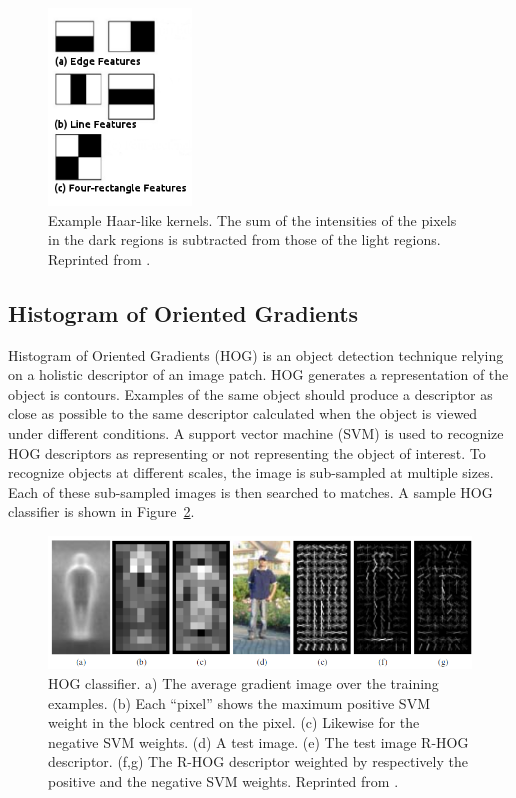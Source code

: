 \begin{figure}[t]
  \centering
  \includegraphics[width=1.5in]{figures/haar.jpg}  
  \caption[Haar kernel ]{Example Haar-like kernels. The sum of the intensities of the pixels in the dark regions is subtracted from those of the light regions. Reprinted from . }
  \label{fig:haar}
\end{figure}



\subsection{Histogram of Oriented Gradients}
Histogram of Oriented Gradients (HOG) \cite{dalal2005histograms} is an object detection technique relying on a holistic descriptor of an image patch. HOG generates a representation of the object is contours. Examples of the same object should produce a descriptor as close as possible to the same descriptor calculated when the object is viewed under different conditions. A support vector machine (SVM) is used to recognize HOG descriptors as representing or not representing the object of interest. To recognize objects at different scales, the image is sub-sampled at multiple sizes. Each of these sub-sampled images is then searched to matches. A sample HOG classifier is shown in Figure~\ref{fig:hog}.

\begin{figure}[t]
  \centering
  \includegraphics[width=5in]{figures/hog.jpg}  
  \caption[HOG]{HOG classifier. a) The average gradient image over the training examples.  (b) Each “pixel”
shows the maximum positive SVM weight in the block centred on the pixel. (c) Likewise for the negative SVM weights. (d) A test image.
(e) The test image R-HOG descriptor. (f,g) The R-HOG descriptor weighted by respectively the positive and the negative SVM weights. Reprinted from . }
  \label{fig:hog}
\end{figure}

